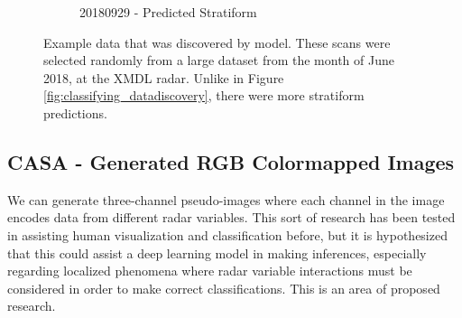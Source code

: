 \begin{figure}[ht]
\begin{subfigure}[b]{0.45\textwidth}
		\caption{20180929 - Predicted Stratiform}
		\label{fig:classifying_datadiscovery_ex8}
	\end{subfigure}
	\caption{Example data that was discovered by model. These scans were selected randomly from a large dataset from the month of June 2018, at the XMDL radar. Unlike in Figure \ref{fig:classifying_datadiscovery}, there were more stratiform predictions.}
	\label{fig:classifying_datadiscovery_201809}
\end{figure}

\subsection{CASA - Generated RGB Colormapped Images}
\label{ssec:classifying_casargbdiscovery}

We can generate three-channel pseudo-images where each channel in the image encodes data from different radar variables.
This sort of research has been tested in assisting human visualization and classification before, but it is hypothesized that this could assist a deep learning model in making inferences, especially regarding localized phenomena where radar variable interactions must be considered in order to make correct classifications.
This is an area of proposed research.